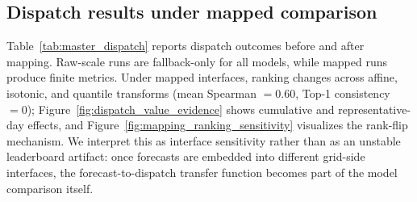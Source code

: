 \documentclass[review,1p,times]{elsarticle}
\begin{document}
\subsection{Dispatch results under mapped comparison}
\label{subsec:results_dispatch}
Table~\ref{tab:master_dispatch} reports dispatch outcomes before and after mapping. Raw-scale runs are fallback-only for all models, while mapped runs produce finite metrics. Under mapped interfaces, ranking changes across affine, isotonic, and quantile transforms (mean Spearman $=0.60$, Top-1 consistency $=0$); Figure~\ref{fig:dispatch_value_evidence} shows cumulative and representative-day effects, and Figure~\ref{fig:mapping_ranking_sensitivity} visualizes the rank-flip mechanism. We interpret this as interface sensitivity rather than as an unstable leaderboard artifact: once forecasts are embedded into different grid-side interfaces, the forecast-to-dispatch transfer function becomes part of the model comparison itself.
\end{document}

